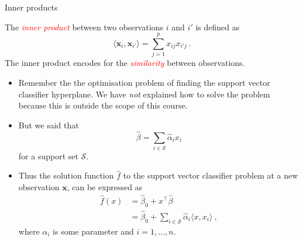 \documentclass[10pt,ignorenonframetext,]{beamer}
\providecommand{\tightlist}{%
  \setlength{\itemsep}{0pt}\setlength{\parskip}{0pt}}
\begin{document}
\begin{frame}

\begin{block}{Inner products}

\vspace{2mm}

The \emph{\textcolor{red}{inner product}} between two observations \(i\)
and \(i'\) is defined as \[
\langle {\boldsymbol x}_i , {\boldsymbol x}_{i'}\rangle =\sum_{j=1}^p x_{ij} x_{i' j} \ .
\] The inner product encodes for the \emph{\textcolor{red}{similarity}}
between observations.

\end{block}

\end{frame}

\begin{frame}

\begin{itemize}
\item
  Remember the the optimisation problem of finding the support vector
  classifier hyperplane. We have \emph{not} explained how to solve the
  problem because this is outside the scope of this course. \vspace{1mm}
\item
  But we said that
  \[\hat{\beta}= \sum_{i\in \mathcal{S}} \hat\alpha_i x_i \] for a
  support set \(\mathcal{S}\). \vspace{1mm}
\end{itemize}

\begin{itemize}
\tightlist
\item
  Thus the solution function \(\hat{f}\) to the support vector
  classifier problem at a new observation \({\boldsymbol x}\), can be
  expressed as \begin{align*}
  \hat{f}(x) & = \hat{\beta}_0 + x^\top \hat\beta  \\
   & = \hat\beta_0 + \sum_{i \in \mathcal{S}} \hat\alpha_i \langle x,x_i \rangle \ ,
  \end{align*} where \(\alpha_i\) is some parameter and \(i=1,...,n\).
\end{itemize}

\end{frame}
\end{document}
